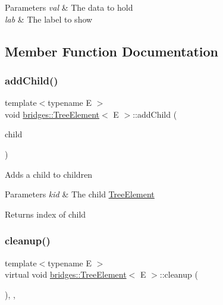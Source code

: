 \begin{DoxyParams}{Parameters}
{\em val} & The data to hold \\
\hline
{\em lab} & The label to show \\
\hline
\end{DoxyParams}


\subsection{Member Function Documentation}
\mbox{\label{classbridges_1_1_tree_element_a5e252fa16df0e673526ba4b08c8d3203}} 
\subsubsection{\texorpdfstring{add\+Child()}{addChild()}}
{\footnotesize\ttfamily template$<$typename E $>$ \\
void \mbox{\hyperlink{classbridges_1_1_tree_element}{bridges\+::\+Tree\+Element}}$<$ E $>$\+::add\+Child (\begin{DoxyParamCaption}\item[{\mbox{\hyperlink{classbridges_1_1_tree_element}{Tree\+Element}}$<$ E $>$ $\ast$}]{child }\end{DoxyParamCaption})\hspace{0.3cm}{\ttfamily [inline]}}

Adds a child to children


\begin{DoxyParams}{Parameters}
{\em kid} & The child \mbox{\hyperlink{classbridges_1_1_tree_element}{Tree\+Element}} \\
\hline
\end{DoxyParams}
\begin{DoxyReturn}{Returns}
index of child 
\end{DoxyReturn}
\mbox{\label{classbridges_1_1_tree_element_aad832c9f8dfd7e92c7b06a825f406e1d}} 
\subsubsection{\texorpdfstring{cleanup()}{cleanup()}}
{\footnotesize\ttfamily template$<$typename E $>$ \\
virtual void \mbox{\hyperlink{classbridges_1_1_tree_element}{bridges\+::\+Tree\+Element}}$<$ E $>$\+::cleanup (\begin{DoxyParamCaption}{ }\end{DoxyParamCaption})\hspace{0.3cm}{\ttfamily [inline]}, {\ttfamily [override]}, {\ttfamily [virtual]}}

